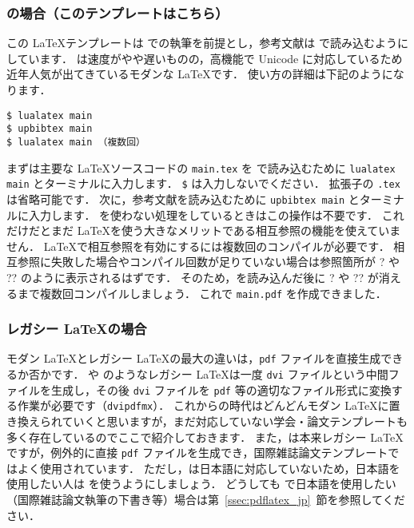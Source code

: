\subsubsection*{\LuaLaTeX の場合（このテンプレートはこちら）}

この \LaTeX テンプレートは \LuaLaTeX での執筆を前提とし，参考文献は \upBibTeX で読み込むようにしています．
\LuaLaTeX は速度がやや遅いものの，高機能で Unicode に対応しているため近年人気が出てきているモダンな \LaTeX です．
使い方の詳細は下記のようになります．

\begin{tcolorbox}[enhanced, title=\LuaLaTeX$+$\upBibTeX, drop fuzzy shadow]
\begin{verbatim}
$ lualatex main
$ upbibtex main
$ lualatex main （複数回）
\end{verbatim}
\end{tcolorbox}

まずは主要な \LaTeX ソースコードの \verb|main.tex| を \LuaLaTeX で読み込むために \verb|lualatex main| とターミナルに入力します．
\verb|$| は入力しないでください．
拡張子の \verb|.tex| は省略可能です．
次に，参考文献を読み込むために \verb|upbibtex main| とターミナルに入力します．
\BibTeX を使わない処理をしているときはこの操作は不要です．
これだけだとまだ \LaTeX を使う大きなメリットである相互参照の機能を使えていません．
\LaTeX で相互参照を有効にするには複数回のコンパイルが必要です．
相互参照に失敗した場合やコンパイル回数が足りていない場合は参照箇所が ? や ?? のように表示されるはずです．
そのため，\upBibTeX を読み込んだ後に ? や ?? が消えるまで複数回コンパイルしましょう．
これで \verb|main.pdf| を作成できました．

\subsubsection*{レガシー \LaTeX の場合}

モダン \LaTeX とレガシー \LaTeX の最大の違いは，\verb|pdf| ファイルを直接生成できるか否かです．
\pLaTeX や \upLaTeX のようなレガシー \LaTeX は一度 \verb|dvi| ファイルという中間ファイルを生成し，その後 \verb|dvi| ファイルを \verb|pdf| 等の適切なファイル形式に変換する作業が必要です（\verb|dvipdfmx|）．
これからの時代はどんどんモダン \LaTeX に置き換えられていくと思いますが，まだ対応していない学会・論文テンプレートも多く存在しているのでここで紹介しておきます．
また，\pdfLaTeX は本来レガシー \LaTeX ですが，例外的に直接 \verb|pdf| ファイルを生成でき，国際雑誌論文テンプレートではよく使用されています．
ただし，\pdfLaTeX は日本語に対応していないため，日本語を使用したい人は \LuaLaTeX を使うようにしましょう．
どうしても \pdfLaTeX で日本語を使用したい（国際雑誌論文執筆の下書き等）場合は第~\ref{ssec:pdflatex_jp}~節を参照してください．

